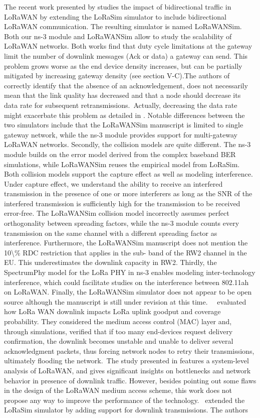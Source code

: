  \cite{pop_does_2017}   The recent work presented by \citet{pop_does_2017} studies the impact of bidirectional traffic in LoRaWAN by extending the LoRaSim simulator to include bidirectional LoRaWAN communication. The resulting simulator is named LoRaWANSim. Both our ns-3 module and LoRaWANSim allow to study the scalability of LoRaWAN networks. Both works find that duty cycle limitations at the gateway limit the number of downlink messages (Ack or data) a gateway can send. This problem grows worse as the end device density increases, but can be partially mitigated by increasing gateway density (see section V-C).The authors of \cite{pop_does_2017} correctly identify that the absence of an acknowledgement, does not necessarily mean that the link quality has decreased and that a node should decrease its data rate for subsequent retransmissions.~Actually, decreasing the data rate might exacerbate this problem as detailed in \cite{pop_does_2017}. Notable differences between the two simulators include that the LoRaWANSim manuscript is limited to single gateway network, while the ns-3 module provides support for multi-gateway LoRaWAN networks. Secondly, the collision models are quite different. The ns-3 module builds on the error model derived from the complex baseband BER simulations, while LoRaWANSim reuses the empirical model from LoRaSim. Both collision models support the capture effect as well as modeling interference. Under capture effect, we understand the ability to receive an interfered transmission in the presence of one or more interferers as long as the SNR of the interfered transmission is sufficiently high for the transmission to be received error-free. The LoRaWANSim collision model incorrectly assumes perfect orthogonality between spreading factors, while the ns-3 module counts every transmission on the same channel with a different spreading factor as interference. Furthermore, the LoRaWANSim manuscript does not mention the 10\textbackslash\% RDC restriction that applies in the sub- band of the RW2 channel in the EU. This underestimates the downlink capacity in RW2. Thirdly, the SpectrumPhy model for the LoRa PHY in ns-3 enables modeling inter-technology interference, which could facilitate studies on the interference between 802.11ah on LoRaWAN. Finally, the LoRaWANSim simulator does not appear to be open source although the manuscript is still under revision at this time.~~\citet{pop_does_2017} evaluated how LoRa WAN downlink impacts LoRa uplink goodput and coverage probability. They considered the medium access control (MAC) layer and, through simulations, verified that if too many end-devices request delivery confirmation, the downlink becomes unstable and unable to deliver several acknowledgment packets, thus forcing network nodes to retry their transmissions, ultimately flooding the network.~The study presented in \cite{pop_does_2017} features a system-level analysis of LoRaWAN, and gives significant insights on bottlenecks and network behavior in presence of downlink traffic. However, besides pointing out some flaws in the design of the LoRaWAN medium access scheme, this work does not propose any way to improve the performance of the technology.~\citet{pop_does_2017} extended the LoRaSim simulator by adding support for downlink transmissions. The authors 